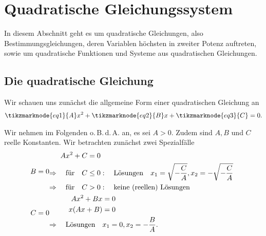 
\thispagestyle{plain}
\section{Quadratische Gleichungssystem}

In diesem Abschnitt geht es um quadratische Gleichungen, also Bestimmungsgleichungen, deren Variablen höchsten in zweiter Potenz auftreten, sowie um quadratische Funktionen und Systeme aus quadratischen Gleichungen.

\subsection{Die quadratische Gleichung}

Wir schauen uns zunächst die allgemeine Form einer quadratischen Gleichung an 
\begin{align}
    \tikzmarknode{eq1}{A} x^2 + \tikzmarknode{eq2}{B} x + \tikzmarknode{eq3}{C} =0.
\end{align}

Wir nehmen im Folgenden o.\,B.\,d.\,A. an, es sei $A >0$. Zudem sind $A,B$ und $C$ reelle Konstanten. Wir betrachten zunächst zwei Spezialfälle
\begin{align}
    B &= 0 
    \begin{split}
        A x^2 + C &= 0 \\
        \Rightarrow \qq{für} C &\le 0: \qq{Lösungen} x_1 = \sqrt{-\frac{C}{A}}, x_2 = -\sqrt{-\frac{C}{A}} \\
        \Rightarrow \qq{für} C &>0: \qq{keine (reellen) Lösungen}
    \end{split}\\
    C &= 0 
    \begin{split}
        A x^2 + Bx &= 0 \\
         x(Ax + B) &= 0 \\
        \Rightarrow \qq{Lösungen} &x_1 = 0, x_2 = -\frac{B}{A}.\hspace{3.85cm}
    \end{split}
\end{align}

